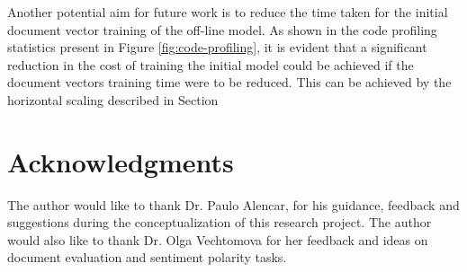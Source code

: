 \documentclass[conference]{IEEEtran}
\begin{document}
    Another potential aim for future work is to reduce the time taken for the initial document vector training of the off-line model.
    As shown in the code profiling statistics present in Figure \ref{fig:code-profiling}, it is evident that a significant reduction in the cost of training the initial model could be achieved if the document vectors training time were to be reduced. 
    This can be achieved by the horizontal scaling described in Section 

\vspace{5mm}

\section{Acknowledgments}
    The author would like to thank Dr. Paulo Alencar, for his guidance, feedback and suggestions during the conceptualization of this research project. The author would also like to thank Dr. Olga Vechtomova for her feedback and ideas on document evaluation and sentiment polarity tasks.

\vspace{5mm}



\end{document}
